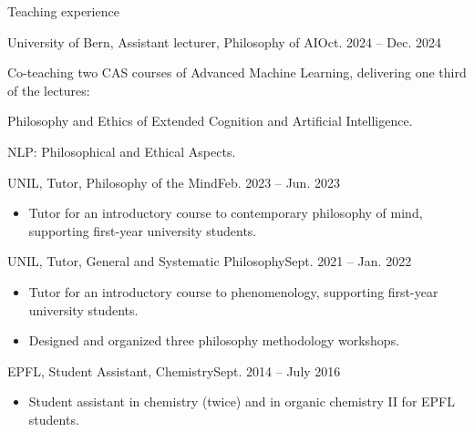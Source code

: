 \documentclass[]{mcdowellcv}
\begin{document}
    \begin{cvsection}{Teaching experience}

      \begin{cvsubsection}{University of Bern, Assistant lecturer, Philosophy of AI}{}{Oct. 2024 -- Dec. 2024}
\begin{itemize}
 \item Co-teaching two CAS courses of Advanced Machine Learning, delivering one third of the lectures:
 {\setlength\itemindent{25pt} \item Philosophy and Ethics of Extended Cognition and Artificial Intelligence.}
 {\setlength\itemindent{25pt} \item NLP: Philosophical and Ethical Aspects.}
\end{itemize}
\end{cvsubsection}
       
  \begin{cvsubsection}{UNIL, Tutor, Philosophy of the Mind}{}{Feb. 2023 -- Jun. 2023}
\begin{itemize}
\item Tutor for an introductory course to contemporary philosophy of mind, supporting first-year university students.
\end{itemize}
\end{cvsubsection}

  \begin{cvsubsection}{UNIL, Tutor, General and Systematic Philosophy}{}{Sept. 2021 -- Jan. 2022}
\begin{itemize}
\item Tutor for an introductory course to phenomenology, supporting first-year university students.
\item Designed and organized three philosophy methodology workshops.
\end{itemize}
\end{cvsubsection}


\begin{cvsubsection}{EPFL, Student Assistant, Chemistry}{}{Sept. 2014 -- July 2016} \begin{itemize} \item Student assistant in chemistry (twice) and in organic chemistry II for EPFL students. \end{itemize} \end{cvsubsection}


    \end{cvsection}    
\end{document}
